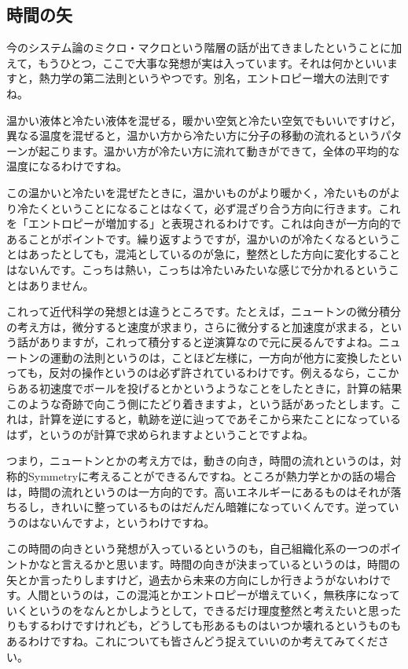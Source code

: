 \documentclass{ltjsbook}
\begin{document}
\subsection{時間の矢}

今のシステム論のミクロ・マクロという階層の話が出てきましたということに加えて，もうひとつ，ここで大事な発想が実は入っています。それは何かといいますと，熱力学の第二法則というやつです。別名，エントロピー増大の法則ですね。

温かい液体と冷たい液体を混ぜる，暖かい空気と冷たい空気でもいいですけど，異なる温度を混ぜると，温かい方から冷たい方に分子の移動の流れるというパターンが起こります。温かい方が冷たい方に流れて動きができて，全体の平均的な温度になるわけですね。

この温かいと冷たいを混ぜたときに，温かいものがより暖かく，冷たいものがより冷たくということになることはなくて，必ず混ざり合う方向に行きます。これを「エントロピーが増加する」と表現されるわけです。これは向きが一方向的であることがポイントです。繰り返すようですが，温かいのが冷たくなるということはあったとしても，混沌としているのが急に，整然とした方向に変化することはないんです。こっちは熱い，こっちは冷たいみたいな感じで分かれるということはありません。

これって近代科学の発想とは違うところです。たとえば，ニュートンの微分積分の考え方は，微分すると速度が求まり，さらに微分すると加速度が求まる，という話がありますが，これって積分すると逆演算なので元に戻るんですよね。ニュートンの運動の法則というのは，ことほど左様に，一方向が他方に変換したといっても，反対の操作というのは必ず許されているわけです。例えるなら，ここからある初速度でボールを投げるとかというようなことをしたときに，計算の結果このような奇跡で向こう側にたどり着きますよ，という話があったとします。これは，計算を逆にすると，軌跡を逆に辿ってであそこから来たことになっているはず，というのが計算で求められますよということですよね。

つまり，ニュートンとかの考え方では，動きの向き，時間の流れというのは，対称的Symmetryに考えることができるんですね。ところが熱力学とかの話の場合は，時間の流れというのは一方向的です。高いエネルギーにあるものはそれが落ちるし，きれいに整っているものはだんだん暗雑になっていくんです。逆っていうのはないんですよ，というわけですね。

この時間の向きという発想が入っているというのも，自己組織化系の一つのポイントかなと言えるかと思います。時間の向きが決まっているというのは，時間の矢とか言ったりしますけど，過去から未来の方向にしか行きようがないわけです。人間というのは，この混沌とかエントロピーが増えていく，無秩序になっていくというのをなんとかしようとして，できるだけ理度整然と考えたいと思ったりもするわけですけれども，どうしても形あるものはいつか壊れるというものもあるわけですね。これについても皆さんどう捉えていいのか考えてみてください。
\end{document}
